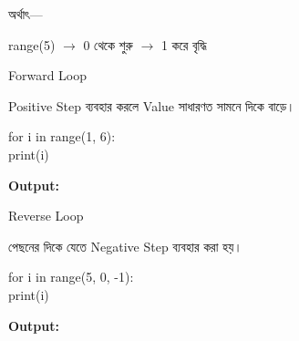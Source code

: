 অর্থাৎ—

\begin{center}

\textenglish{\ttfamily range(5)}
\(\longrightarrow\)
0 থেকে শুরু
\(\longrightarrow\)
1 করে বৃদ্ধি

\end{center}



\noindent
\begin{minipage}[t]{0.49\linewidth}

\begin{sideexamplebox}{Forward Loop}

Positive Step ব্যবহার করলে Value সাধারণত সামনে দিকে বাড়ে।

\begin{sidecodebox}
\begin{english}
\ttfamily
for i in range(1, 6):\\
\hspace*{4mm}print(i)
\end{english}
\end{sidecodebox}

\textbf{Output:}

\begin{center}
\textenglish{    }
\end{center}

\end{sideexamplebox}

\end{minipage}
\hfill
\begin{minipage}[t]{0.49\linewidth}

\begin{sideexamplebox}{Reverse Loop}

পেছনের দিকে যেতে Negative Step ব্যবহার করা হয়।

\begin{sidecodebox}
\begin{english}
\ttfamily
for i in range(5, 0, -1):\\
\hspace*{4mm}print(i)
\end{english}
\end{sidecodebox}

\textbf{Output:}

\begin{center}
\textenglish{    }
\end{center}

\end{sideexamplebox}

\end{minipage}

